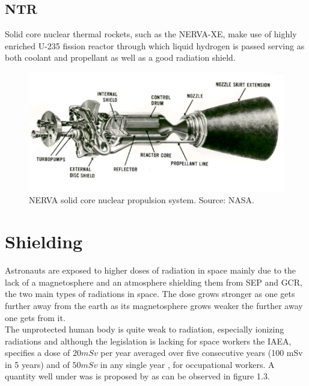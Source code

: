 \documentclass[12pt,a4paper]{report}
\begin{document}
\subsection{NTR}
Solid core nuclear thermal rockets, such as the NERVA-XE, make use of highly enriched U-235 fission reactor through which liquid hydrogen is passed serving as both coolant and propellant \cite{Finseth1991} as well as a good radiation shield.
\begin{figure}[hbtp]
\centering
\includegraphics[scale=.7]{img/NERVA-solid-core-nuclear-propulsion-system.png}
\caption{NERVA solid core nuclear propulsion system. Source:
NASA.}
\end{figure}


\section{Shielding}
Astronauts are exposed to higher doses of radiation in space mainly due to the lack of a magnetosphere and an atmosphere shielding them from SEP and GCR, the two main types of radiations in space. The dose grows stronger as one gets further away from the earth as its magnetosphere grows weaker the further away one gets from it.\\
The unprotected human body is quite weak to radiation, especially ionizing radiations and although the legislation is lacking for space workers the IAEA, specifies a dose of $20mSv$ per year averaged over five consecutive years (100 mSv in 5 years) and of $50mSv$ in any single year \cite{IAEA-GSG}, for occupational workers. A quantity well under was is proposed by \cite{Hoffman1997} as can be observed in figure 1.3.
\end{document}
